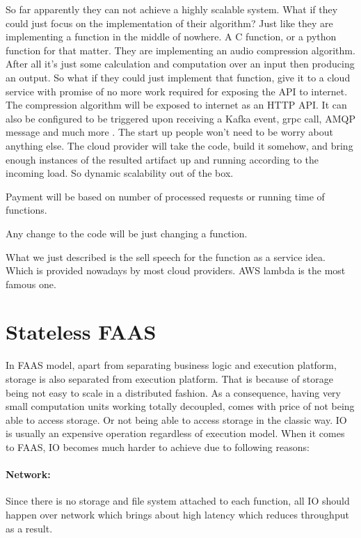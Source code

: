 \documentclass[a4]{report}
\begin{document}
    So far apparently they can not achieve a highly scalable system.
    What if they could just focus on the implementation of their algorithm?
    Just like they are implementing a function in the middle of nowhere.
    A C function, or a python function for that matter.
    They are implementing an audio compression algorithm.
    After all it's just some calculation and computation over an input then producing an output.
    So what if they could just implement that function, give it to a cloud service with promise of no more work
    required for exposing the API to internet.
    The compression algorithm will be exposed to internet as an HTTP API.
    It can also be configured to be triggered upon receiving a Kafka event, grpc call, AMQP message and much more .
    The start up people won't need to be worry about anything else.
    The cloud provider will take the code, build it somehow, and bring enough instances of the resulted artifact up and
    running according to the incoming load.
    So dynamic scalability out of the box.

    Payment will be based on number of processed requests or running time of functions.

    Any change to the code will be just changing a function.

    What we just described is the sell speech for the function as a service idea.
    Which is provided nowadays by most cloud providers.
    AWS lambda\cite{lambda} is the most famous one.


    \section{Stateless FAAS}
    In FAAS model, apart from separating business logic and execution platform, storage is also separated from
    execution platform.
    That is because of storage being not easy to scale in a distributed fashion.
    As a consequence, having very small computation units working totally decoupled, comes with price of not being
    able to access storage.
    Or not being able to access storage in the classic way.
    IO is usually an expensive operation regardless of execution model.
    When it comes to FAAS, IO becomes much harder to achieve due to following reasons:

    \paragraph{Network:} Since there is no storage and file system attached to each function, all IO should happen
    over network which brings about high latency which reduces throughput as a result.
\end{document}
